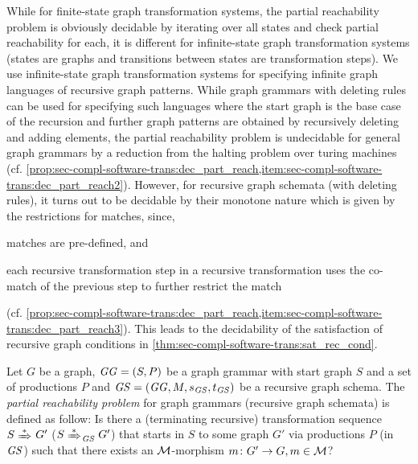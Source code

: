 While for finite-state graph transformation systems, the partial reachability problem is obviously decidable by iterating over all states and check partial reachability for each, it is different for infinite-state graph transformation systems (states are graphs and transitions between states are transformation steps).
We use infinite-state graph transformation systems for specifying infinite graph languages of recursive graph patterns.
While graph grammars with deleting rules can be used for specifying such languages where the start graph is the base case of the recursion and further graph patterns are obtained by recursively deleting and adding elements, the partial reachability problem is undecidable for general graph grammars by a reduction from the halting problem over turing machines (cf. \cref{prop:sec-compl-software-trans:dec_part_reach,item:sec-compl-software-trans:dec_part_reach2}).
However, for recursive graph schemata (with deleting rules), it turns out to be decidable by their monotone nature which is given by the restrictions for matches, since,
\begin{enumerate*}
\item matches are pre-defined, and
\item each recursive transformation step in a recursive transformation uses the co-match of the previous step to further restrict the match
\end{enumerate*} (cf. \cref{prop:sec-compl-software-trans:dec_part_reach,item:sec-compl-software-trans:dec_part_reach3}).
This leads to the decidability of the satisfaction of recursive graph conditions in \cref{thm:sec-compl-software-trans:sat_rec_cond}.

\begin{definition}
Let $G$ be a graph, $\mathit{GG}=(S,P)$ be a graph grammar with start graph $S$ and a set of productions $P$ and $\mathit{GS}=(\mathit{GG},M,s_\mathit{GS},t_\mathit{GS})$ be a recursive graph schema.
The \emph{partial reachability problem} for graph grammars (recursive graph schemata) is defined as follow: Is there a (terminating recursive) transformation sequence $S \Trans{*} G'$ ($S \Trans{*}_\GS G'$) that starts in $S$ to some graph $G'$ via productions $P$ (in $\mathit{GS}$) such that there exists an ${\cal M}$-morphism $m\colon G' \to G,m \in {\cal M}$?
\envEndMarker
\end{definition}

